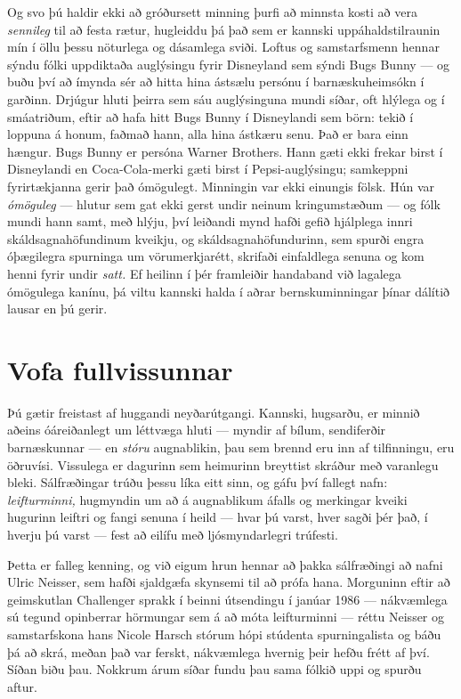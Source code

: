 Og svo þú haldir ekki að gróðursett minning þurfi að minnsta kosti að vera \emph{sennileg} til að festa rætur, hugleiddu þá það sem er kannski uppáhaldstilraunin mín í öllu þessu nöturlega og dásamlega sviði. Loftus og samstarfsmenn hennar sýndu fólki uppdiktaða auglýsingu fyrir Disneyland sem sýndi Bugs Bunny — og buðu því að ímynda sér að hitta hina ástsælu persónu í barnæskuheimsókn í garðinn. Drjúgur hluti þeirra sem sáu auglýsinguna mundi síðar, oft hlýlega og í smáatriðum, eftir að hafa hitt Bugs Bunny í Disneylandi sem börn: tekið í loppuna á honum, faðmað hann, alla hina ástkæru senu. Það er bara einn hængur. Bugs Bunny er persóna Warner Brothers. Hann gæti ekki frekar birst í Disneylandi en Coca-Cola-merki gæti birst í Pepsi-auglýsingu; samkeppni fyrirtækjanna gerir það ómögulegt. Minningin var ekki einungis fölsk. Hún var \emph{ómöguleg} — hlutur sem gat ekki gerst undir neinum kringumstæðum — og fólk mundi hann samt, með hlýju, því leiðandi mynd hafði gefið hjálplega innri skáldsagnahöfundinum kveikju, og skáldsagnahöfundurinn, sem spurði engra óþægilegra spurninga um vörumerkjarétt, skrifaði einfaldlega senuna og kom henni fyrir undir \emph{satt.} Ef heilinn í þér framleiðir handaband við lagalega ómögulega kanínu, þá viltu kannski halda í aðrar bernskuminningar þínar dálítið lausar en þú gerir.

\section*{Vofa fullvissunnar}

Þú gætir freistast af huggandi neyðarútgangi. Kannski, hugsarðu, er minnið aðeins óáreiðanlegt um léttvæga hluti — myndir af bílum, sendiferðir barnæskunnar — en \emph{stóru} augnablikin, þau sem brennd eru inn af tilfinningu, eru öðruvísi. Vissulega er dagurinn sem heimurinn breyttist skráður með varanlegu bleki. Sálfræðingar trúðu þessu líka eitt sinn, og gáfu því fallegt nafn: \emph{leifturminni,} hugmyndin um að á augnablikum áfalls og merkingar kveiki hugurinn leiftri og fangi senuna í heild — hvar þú varst, hver sagði þér það, í hverju þú varst — fest að eilífu með ljósmyndarlegri trúfesti.

Þetta er falleg kenning, og við eigum hrun hennar að þakka sálfræðingi að nafni Ulric Neisser, sem hafði sjaldgæfa skynsemi til að prófa hana. Morguninn eftir að geimskutlan Challenger sprakk í beinni útsendingu í janúar 1986 — nákvæmlega sú tegund opinberrar hörmungar sem á að móta leifturminni — réttu Neisser og samstarfskona hans Nicole Harsch stórum hópi stúdenta spurningalista og báðu þá að skrá, meðan það var ferskt, nákvæmlega hvernig þeir hefðu frétt af því. Síðan biðu þau. Nokkrum árum síðar fundu þau sama fólkið uppi og spurðu aftur.


